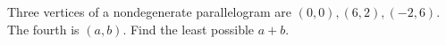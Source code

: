 Three vertices of a nondegenerate parallelogram are $(0,0),(6,2),(-2,6)$. The fourth is $(a,b)$. Find the least possible $a+b$.
